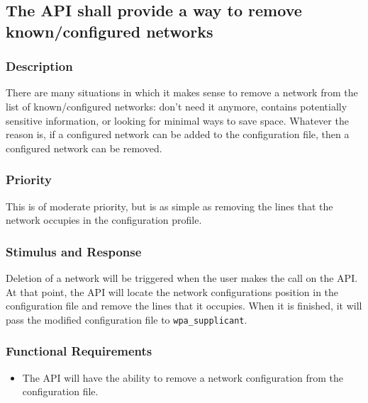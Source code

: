 
\subsection{The API shall provide a way to remove known/configured networks}
\subsubsection{Description}
There are many situations in which it makes sense to remove a network from the 
list of known/configured networks: don't need it anymore, contains potentially
sensitive information, or looking for minimal ways to save space. Whatever the
reason is, if a configured network can be added to the configuration file, then
a configured network can be removed.

\subsubsection{Priority}
This is of moderate priority, but is as simple as removing the lines that the
network occupies in the configuration profile.

\subsubsection{Stimulus and Response}
Deletion of a network will be triggered when the user makes the call on the
API. At that point, the API will locate the network configurations position
in the configuration file and remove the lines that it occupies. When it is
finished, it will pass the modified configuration file to \texttt{wpa\_supplicant}.

\subsubsection{Functional Requirements}
\begin{itemize}
    \item The API will have the ability to remove a network configuration from the
      configuration file.
\end{itemize}

